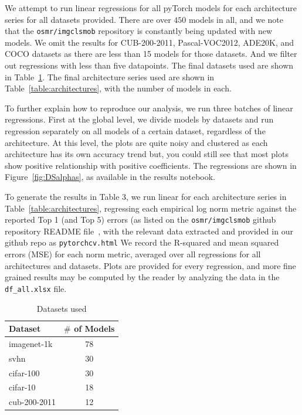 We attempt to run linear regressions for all pyTorch models for each architecture series for all datasets provided.  
There are over $450$ models in all, and we note that the \texttt{osmr/imgclsmob} repository is constantly being updated with new models.
We omit the results for CUB-200-2011, Pascal-VOC2012, ADE20K, and COCO datasets as there are less than 15 models
for those datasets.  And we filter out regressions with less than five datapoints.
The final datasets used are shown in Table~\ref{table:datasets}.
The final architecture series used are shown in  Table~\ref{table:architectures}, with the number of models in each.

To further explain how to reproduce our analysis, we run three batches of linear regressions. First at the global level, we divide models by datasets and run regression separately on all models of a certain dataset, regardless of the architecture. At this level, the plots are quite noisy and clustered as each architecture has its own accuracy trend but, you could still see that most plots show positive relationship with positive coefficients. The regressions are shown in Figure~\ref{fig:DSalphas}, as available in the results notebook.

To generate the results in Table 3, we run linear for each architecture series in Table~\ref{table:architectures},
regressing each empirical log norm metric against the reported Top 1 (and Top 5) errors (as listed on the \texttt{osmr/imgclsmob} github 
repository README file~\cite{osmr}, with the relevant data extracted and provided in our github repo as \texttt{pytorchcv.html}
We record the R-squared and mean squared errors (MSE) for each norm metric, averaged over all regressions for all architectures and datasets.
Plots are provided for every regression, and more fine grained results may be computed by the reader by 
analyzing the data in the \texttt{df\_all.xlsx} file.

\begin{table}[t]
\small
\begin{center}
\begin{tabular}{|p{1in}|c|}
\hline
Dataset & $\#$ of Models \\
\hline
imagenet-1k   &  78 \\
svhn          &  30 \\
cifar-100     &  30 \\
cifar-10      &  18 \\
cub-200-2011  &  12 \\
\hline
\end{tabular}
\end{center}
\caption{Datasets used}
\label{table:datasets}
\end{table}

